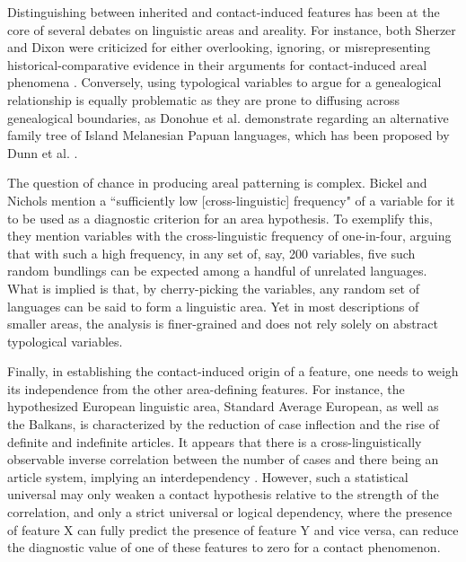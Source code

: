 \documentclass[output=paper,
modfonts
]{langscibook}
\begin{document}
Distinguishing between inherited and contact-induced features has been at the core of several debates on linguistic areas and areality. For instance, both Sherzer \parencite*{sherzer76} and Dixon \parencite*{dixon2002} were criticized for either overlooking, ignoring, or misrepresenting historical-comparative evidence in their arguments for contact-induced areal phenomena \parencite[for the criticism, see][]{campbell1985,evans2005}. Conversely, using typological variables to argue for a genealogical relationship is equally problematic as they are prone to diffusing across genealogical boundaries, as Donohue et al. \parencite*{donohueetal2008} demonstrate regarding an alternative family tree of Island Melanesian Papuan languages, which has been proposed by Dunn et al. \parencite*{dunnetal2007}.

The question of chance in producing areal patterning is complex. Bickel and Nichols \parencite*{Bickeletal2006Oceania} mention a ``sufficiently low [cross-linguistic] frequency" of a variable for it to be used as a diagnostic criterion for an area hypothesis. To exemplify this, they mention variables with the cross-linguistic frequency of one-in-four, arguing that with such a high frequency, in any set of, say, 200 variables, five such random bundlings can be expected among a handful of unrelated languages. What is implied is that, by cherry-picking the variables, any random set of languages can be said to form a linguistic area. Yet in most descriptions of smaller areas, the analysis is finer-grained and does not rely solely on abstract typological variables.

Finally, in establishing the contact-induced origin of a feature, one needs to weigh its independence from the other area-defining features. For instance, the hypothesized European linguistic area, Standard Average European, as well as the Balkans, is characterized by the reduction of case inflection and the rise of definite and indefinite articles. It appears that there is a cross-linguistically observable inverse correlation between the number of cases and there being an article system, implying an interdependency \parencite{sinnemäki2018}. However, such a statistical universal may only weaken a contact hypothesis relative to the strength of the correlation, and only a strict universal or logical dependency, where the presence of feature X can fully predict the presence of feature Y and vice versa, can reduce the diagnostic value of one of these features to zero for a contact phenomenon.
\end{document}
